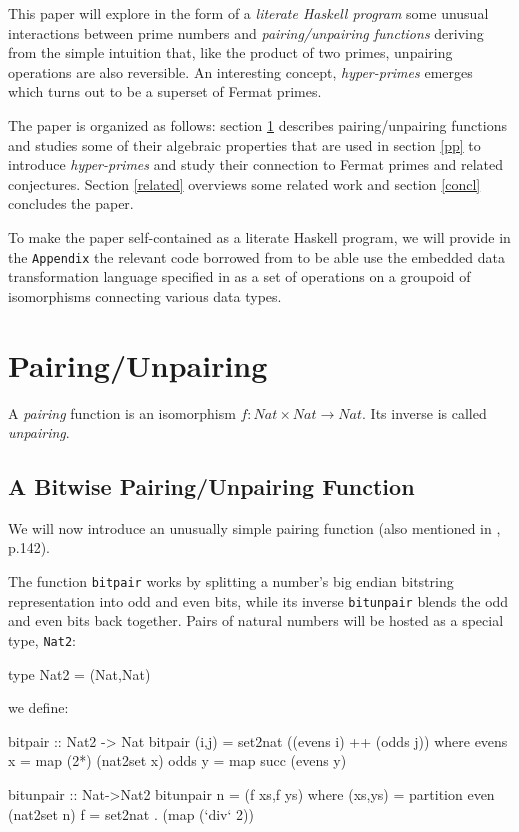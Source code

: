 \documentclass[]{INCLUDES/llncs}
\begin{document}
This paper will explore in the form of a {\em literate Haskell program} some
unusual interactions between prime numbers and {\em pairing/unpairing
functions} deriving from the simple intuition that, like the product of two
primes, unpairing operations are also reversible. An interesting concept, {\em
hyper-primes} emerges which turns out to be a superset of Fermat primes.

The paper is organized as follows: section \ref{pairings} describes
pairing/unpairing functions and studies some of their algebraic properties that are used
in section \ref{pp} to introduce {\em hyper-primes} and study their
connection to Fermat primes and related conjectures.
Section \ref{related} overviews some related work and section \ref{concl}
concludes the paper.

To make the paper
self-contained as a literate Haskell program, we will provide in the
{\tt Appendix} the relevant code borrowed from \cite{sac09fISO} to be
able use the embedded data transformation language
specified in \cite{sac09fISO} as a set of operations on a groupoid of
isomorphisms connecting various data types. 

\section{Pairing/Unpairing} \label{pairings}

A {\em pairing} function is an isomorphism $f:Nat \times Nat
\rightarrow Nat$. Its inverse is called {\em unpairing}.


\subsection{A Bitwise Pairing/Unpairing Function}
We will now introduce an unusually simple pairing function 
(also mentioned in \cite{pigeon}, p.142).

The function {\tt bitpair} works by splitting a 
number's big endian bitstring
representation into odd and even bits, 
while its inverse {\tt bitunpair}
blends the odd and even bits back together.
Pairs of natural numbers will be hosted as a special type, {\tt Nat2}:
\begin{code}
type Nat2 = (Nat,Nat)
\end{code}
we define:
\begin{code}
bitpair ::  Nat2 -> Nat
bitpair (i,j) = 
  set2nat ((evens i) ++ (odds j)) where
    evens x = map (2*) (nat2set x)
    odds y = map succ (evens y)

bitunpair :: Nat->Nat2  
bitunpair n = (f xs,f ys) where 
  (xs,ys) = partition even (nat2set n)
  f = set2nat . (map (`div` 2))
\end{code}
\end{document}
